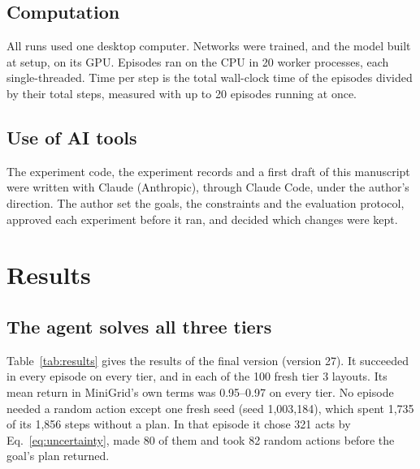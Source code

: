 \documentclass{article}
\begin{document}
\subsection{Computation}

All runs used one desktop computer. Networks were trained, and the model built at setup, on its GPU. Episodes ran on the CPU in 20 worker processes, each single-threaded. Time per step is the total wall-clock time of the episodes divided by their total steps, measured with up to 20 episodes running at once.

\subsection{Use of AI tools}

The experiment code, the experiment records and a first draft of this manuscript were written with Claude (Anthropic), through Claude Code, under the author's direction. The author set the goals, the constraints and the evaluation protocol, approved each experiment before it ran, and decided which changes were kept.

\section{Results}

\subsection{The agent solves all three tiers}

Table~\ref{tab:results} gives the results of the final version (version 27). It succeeded in every episode on every tier, and in each of the 100 fresh tier 3 layouts. Its mean return in MiniGrid's own terms was 0.95--0.97 on every tier. No episode needed a random action except one fresh seed (seed 1,003,184), which spent 1,735 of its 1,856 steps without a plan. In that episode it chose 321 acts by Eq.~\eqref{eq:uncertainty}, made 80 of them and took 82 random actions before the goal's plan returned.
\end{document}
